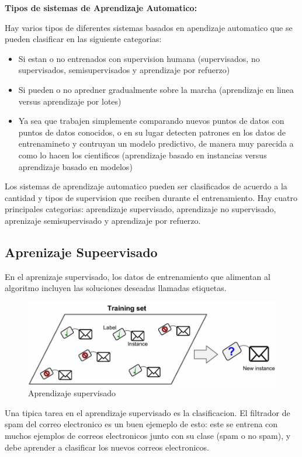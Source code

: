 \textbf{Tipos de sistemas de Aprendizaje Automatico:}

Hay varios tipos de diferentes sistemas basados en apendizaje automatico que se pueden clasificar en las siguiente categorias:

\begin{itemize}

    \item Si estan o no entrenados con supervision humana (supervisados, no supervisados, semisupervisados y aprendizaje por refuerzo)
    
    \item Si pueden o no apredner gradualmente sobre la marcha (aprendizaje en linea versus aprendizaje por lotes)
    
    \item  Ya sea que trabajen simplemente comparando nuevos puntos de datos con puntos de datos conocidos, o en su lugar detecten patrones en los datos de entrenamineto y contruyan un modelo predictivo, de manera muy parecida a como lo hacen los cientificos (aprendizaje basado en instancias versus aprendizaje basado en modelos)
    
\end{itemize}

Los sistemas de aprendizaje automatico pueden ser clasificados de acuerdo a la cantidad y tipos de supervision que reciben durante el entrenamiento. Hay cuatro principales categorias: aprendizaje supervisado, aprendizaje no supervisado, aprenizaje semisupervisado y aprendizaje por refuerzo.

\subsection{Aprenizaje Supeervisado}
En el aprenizaje supervisado, los datos de entrenamiento que alimentan al algoritmo incluyen las soluciones deseadas llamadas etiquetas.

\begin{figure}[ht]
	\centering
	\includegraphics[width=0.30\linewidth]{figuras/supervisedLearning.png}
	\caption{Aprendizaje supervisado}
	\label{AS}
\end{figure}

Una tipica tarea en el aprendizaje supervisado es la clasificacion. El filtrador de spam del correo electronico es un buen ejemeplo de esto: este se entrena con muchos ejemplos de correos electronicos junto con su clase (spam o no spam), y debe aprender a clasificar los nuevos correos electronicos.


